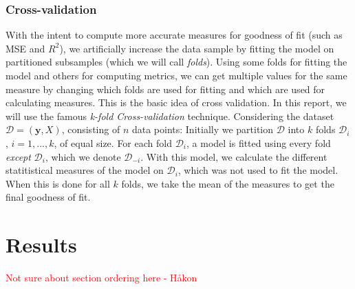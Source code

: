 \documentclass[twocolumn,english,notitlepage]{article}
\newcommand{\comment}[1]{\textcolor{red}{#1}}
\renewcommand{\vec}[1]{\boldsymbol{#1}}
\begin{document}
        \subsubsection*{Cross-validation}
        With the intent to compute more accurate measures for goodness of fit (such as MSE and $R^2$), we 
        artificially increase the data sample by fitting the model on partitioned subsamples (which we will call \textit{folds}). Using some folds
        for fitting the model and others for computing metrics, we can get multiple values for the same measure by changing which folds are used for fitting 
        and which are used for calculating measures. This is the basic idea of cross validation.
        \newline\newline
        In this report, we will use the famous \textit{k-fold Cross-validation} technique. Considering the dataset $\mathcal{D} = (\vec{y}, X)$, consisting of $n$ data points: Initially we partition $\mathcal{D}$ into $k$ folds $\mathcal{D}_i$, $i = 1, ... , k$, of equal size. For each fold $\mathcal{D}_i$, a model is fitted using every fold \textit{except} $\mathcal{D}_i$, which we denote $\mathcal{D}_{-i}$. With this model, we calculate the different statitistical measures of the model on $\mathcal{D}_i$, which was not used to fit the model. When this is done for all $k$ folds, we take the mean of the measures to get the 
        final goodness of fit. 


\section{Results}
    \comment{Not sure about section ordering here - Håkon}
\end{document}
